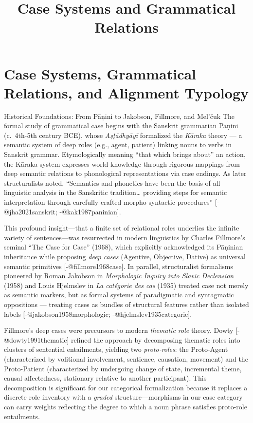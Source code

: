 \documentclass[
  ignorenonframetext,
]{beamer}
\title{\texorpdfstring{Case Systems and Grammatical
Relations}{Case Systems and Grammatical Relations}}
\author{\texorpdfstring{}{}}
\date{}
\begin{document}
\frame{\titlepage}

\section{Case Systems, Grammatical Relations, and Alignment
Typology}\label{sec:case-systems}

\begin{frame}{Historical Foundations: From Pāṇini to Jakobson, Fillmore,
and Mel'čuk}
\protect{}\label{historical-foundations-from-pux101ux1e47ini-to-jakobson-fillmore-and-melux10duk}
The formal study of grammatical case begins with the Sanskrit grammarian
Pāṇini (c.~4th-5th century BCE), whose \emph{Aṣṭādhyāyī} formalized the
\emph{Kāraka} theory --- a semantic system of deep roles (e.g., agent,
patient) linking nouns to verbs in Sanskrit grammar. Etymologically
meaning ``that which brings about'' an action, the Kāraka system
expresses world knowledge through rigorous mappings from deep semantic
relations to phonological representations via case endings. As later
structuralists noted, ``Semantics and phonetics have been the basis of
all linguistic analysis in the Sanskritic tradition\ldots{} providing
steps for semantic interpretation through carefully crafted
morpho-syntactic procedures'' {[}-@jha2021sanskrit;
-@kak1987paninian{]}.

This profound insight---that a finite set of relational roles underlies
the infinite variety of sentences---was resurrected in modern
linguistics by Charles Fillmore's seminal ``The Case for Case'' (1968),
which explicitly acknowledged its Pāṇinian inheritance while proposing
\emph{deep cases} (Agentive, Objective, Dative) as universal semantic
primitives {[}-@fillmore1968case{]}. In parallel, structuralist
formalisms pioneered by Roman Jakobson in \emph{Morphologic Inquiry into
Slavic Declension} (1958) and Louis Hjelmslev in \emph{La catégorie des
cas} (1935) treated case not merely as semantic markers, but as formal
systems of paradigmatic and syntagmatic oppositions --- treating cases
as bundles of structural features rather than isolated labels
{[}-@jakobson1958morphologic; -@hjelmslev1935categorie{]}.

Fillmore's deep cases were precursors to modern \emph{thematic role}
theory. Dowty {[}-@dowty1991thematic{]} refined the approach by
decomposing thematic roles into clusters of sentential entailments,
yielding two \emph{proto-roles}: the Proto-Agent (characterized by
volitional involvement, sentience, causation, movement) and the
Proto-Patient (characterized by undergoing change of state, incremental
theme, causal affectedness, stationary relative to another participant).
This decomposition is significant for our categorical formalization
because it replaces a discrete role inventory with a \emph{graded}
structure---morphisms in our case category can carry weights reflecting
the degree to which a noun phrase satisfies proto-role entailments.


\end{frame}
\end{document}
